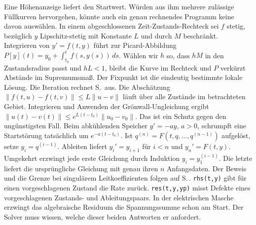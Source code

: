 \hypertarget{punkt1-2-1}{}
Eine Höhenanzeige liefert den Startwert. Würden aus ihm mehrere zulässige Füllkurven hervorgehen, könnte auch ein genau rechnendes Programm keine davon auswählen. In einem abgeschlossenen Zeit-Zustands-Rechteck sei \(f\) stetig, bezüglich \(y\) Lipschitz-stetig mit Konstante \(L\) und durch \(M\) beschränkt. Integrieren von \(y'=f(t,y)\) führt zur Picard-Abbildung \(P[y](t)=y_0+\int_{t_0}^{t}f(s,y(s))\,ds\). Wählen wir \(h\) so, dass \(hM\) in den Zustandsradius passt und \(hL<1\), bleibt die Kurve im Rechteck und \(P\) verkürzt Abstände im Supremumsmaß. Der Fixpunkt ist die eindeutig bestimmte lokale Lösung. Die Iteration rechnet S.\, aus.
\hypertarget{punkt1-2-2}{}
Die Abschätzung \(\|f(t,u)-f(t,v)\|\le L\|u-v\|\) läuft über alle Zustände im betrachteten Gebiet. Integrieren und Anwenden der Grönwall-Ungleichung ergibt \(\|u(t)-v(t)\|\le e^{L(t-t_0)}\|u_0-v_0\|\). Das ist ein Schutz gegen den ungünstigsten Fall. Beim abkühlenden Speicher \(y'=-ay\), \(a>0\), schrumpft eine Startstörung tatsächlich um \(e^{-a(t-t_0)}\).
\hypertarget{punkt1-2-3}{}
Ist \(q^{(n)}=F(t,q,\ldots,q^{(n-1)})\) aufgelöst, setze \(y_i=q^{(i-1)}\). Ableiten liefert \(y_i'=y_{i+1}\) für \(i<n\) und \(y_n'=F(t,y)\). Umgekehrt erzwingt jede erste Gleichung durch Induktion \(y_i=y_1^{(i-1)}\). Die letzte liefert die ursprüngliche Gleichung mit genau ihren \(n\) Anfangsdaten. Der Beweis und die Grenze bei singulärem Leitkoeffizienten folgen auf S.\,.
\hypertarget{punkt1-2-4}{}
\texttt{rhs(t,y)} gibt für einen vorgeschlagenen Zustand die Rate zurück. \texttt{res(t,y,yp)} misst Defekte eines vorgeschlagenen Zustands- und Ableitungspaars. In der elektrischen Masche erzwingt das algebraische Residuum die Spannungssumme schon am Start. Der Solver muss wissen, welche dieser beiden Antworten er anfordert.


